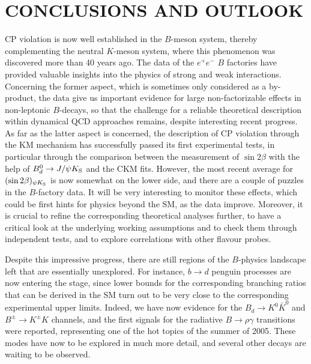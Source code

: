 \documentclass[11pt]{cernrep}
\begin{document}
%
%
%
\section{CONCLUSIONS AND OUTLOOK}\label{sec:concl}
\setcounter{equation}{0}
%
%
%
CP violation is now well established in the $B$-meson system, thereby 
complementing the neutral $K$-meson system, where this phenomenon
was discovered more than 40 years ago. The data of the $e^+e^-$ $B$ factories 
have provided valuable insights into the physics of strong and weak interactions. Concerning the former aspect, which is sometimes only considered as 
a
by-product, the data give us important evidence for large non-factorizable 
effects in non-leptonic $B$-decays, so that the challenge for a reliable theoretical 
description within dynamical QCD approaches remains, despite interesting 
recent progress. As far as the latter aspect is concerned, the description of
CP violation through the KM mechanism has successfully passed its first
experimental tests, in particular through the comparison between the 
measurement of $\sin 2\beta$ with the help of $B^0_d\to J/\psi K_{\rm S}$ and 
the CKM fits. However, the most recent average for $(\sin2\beta)_{\psi K_{\rm S}}$ 
is now somewhat on the lower side, and there are a couple of puzzles in the
$B$-factory data. It will be very interesting to monitor these effects, which
could be first hints for physics beyond the SM, as the data improve. Moreover,
it is crucial to refine the corresponding theoretical analyses further, to have a 
critical look at the underlying working assumptions and to check them through
independent tests, and to explore correlations with other flavour probes. 

Despite this impressive progress, there are still regions of the 
$B$-physics landscape left that are essentially unexplored. 
For instance, $b\to d$ penguin processes are now entering the 
stage, since lower bounds for the corresponding branching ratios 
that can be derived in the SM turn out to be very close to
the corresponding experimental upper limits. Indeed, we have now
evidence for the $B_d\to K^0\bar K^0$ and $B^\pm\to K^\pm K$ channels,
and the first signals for the radiative $B\to\rho\gamma$ transitions
were reported, representing one of the hot topics of the summer of 2005. 
These modes have now to be explored in much more detail, and several other
decays are waiting to be observed. 
\end{document}
